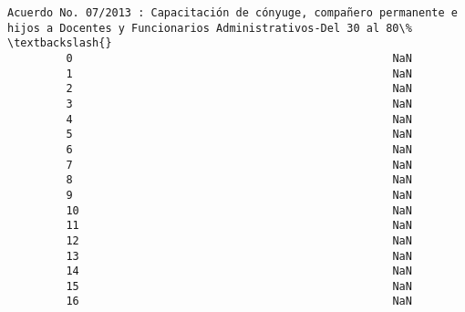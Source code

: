 \documentclass[11pt]{article}
\begin{document}
\begin{Verbatim}[commandchars=\\\{\}]
             Acuerdo No. 07/2013 : Capacitación de cónyuge, compañero permanente e hijos a Docentes y Funcionarios Administrativos-Del 30 al 80\%   \textbackslash{}
         0                                                 NaN                                                                                      
         1                                                 NaN                                                                                      
         2                                                 NaN                                                                                      
         3                                                 NaN                                                                                      
         4                                                 NaN                                                                                      
         5                                                 NaN                                                                                      
         6                                                 NaN                                                                                      
         7                                                 NaN                                                                                      
         8                                                 NaN                                                                                      
         9                                                 NaN                                                                                      
         10                                                NaN                                                                                      
         11                                                NaN                                                                                      
         12                                                NaN                                                                                      
         13                                                NaN                                                                                      
         14                                                NaN                                                                                      
         15                                                NaN                                                                                      
         16                                                NaN                                                                                      

\end{Verbatim}
\end{document}
